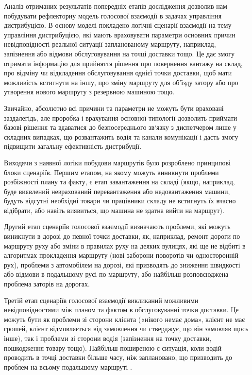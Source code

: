 Аналіз отриманих результатів попередніх етапів дослідження \cite{conf8} дозволив нам побудувати рефлекторну модель \cite{Teslia_2010} голосової взаємодії в задачах управління дистрибуцією. В основу моделі покладено логічні сценарії взаємодії на тему управління дистрибуцією, які мають враховувати параметри основних причин невідповідності реальної ситуації запланованому маршруту, наприклад, запізнення або відмови обслуговування на точці доставки тощо. Це дає змогу отримати інформацію для прийняття рішення про повернення вантажу на склад, про відміну чи відкладення обслуговування однієї точки доставки, щоб мати можливість встигнути на іншу, про зміну маршруту для об’їзду затору або про утворення нового маршруту з резервною машиною тощо.

Звичайно, абсолютно всі причини та параметри не можуть бути враховані заздалегідь, але проробка і врахування основної типології дозволить приймати базові рішення та вдаватися до безпосереднього зв`язку з диспетчером лише у складних випадках, що розвантажить водія та канали комунікації і дасть змогу підвищити загальну ефективність дистрибуції.

Виходячи з наявної логіки побудови маршрутів було розроблено принципові блоки сценаріїв. Першим етапом, на якому можуть виникнути проблеми розбіжності плану та факту, є етап завантаження на складі (якщо, наприклад, буде виявлений неврахований перевантаження або недовантаження машини, будуть відсутні необхідні товари чи працівники складу не встигнуть їх вчасно відібрати, або навіть виявиться, що машина не здатна вийти на маршрут).

Другий етап сценаріїв голосової взаємодії визначають проблеми, які можуть виникнути в дорозі до певної точки доставки, як, наприклад, ремонт дороги по маршруту руху або зміни в правилах руху на деяких вулицях, які ще не відбиті в алгоритмах прокладення маршруту (нові заборони поворотів чи односторонній рух), проблеми з автомобілем на дорозі, які призводять до зниження швидкості або відмови в подальшому русі по маршруту, або найбільш розповсюджена проблема заторів на дорогах. 

Третій етап сценаріїв голосової взаємодії викликаний можливими невідповідностями між планом та фактом в обслуговуванні точки доставки. Це можуть бути як проблеми зі сторони клієнта («нікого немає дома», клієнт не має грошей, клієнт відмовляється від замовлення чи стверджує, що він замовляв щось інше), так і проблеми зі сторони водія (запізнення на точку доставки, пошкодження товару тощо). Найбільш поширеною є ситуація, коли водій проводить в точці доставки більше часу, ніж заплановано, що призводить до проблем на всьому подальшому маршруті \cite{art2}.

